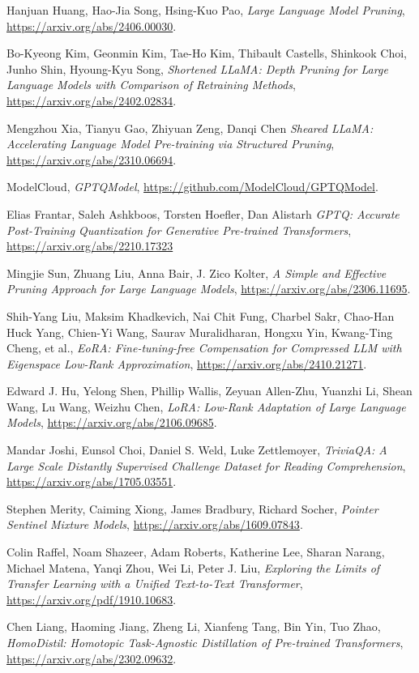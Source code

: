 \begin{thebibliography}{9}
	Hanjuan Huang, Hao-Jia Song, Hsing-Kuo Pao,
	\textit{Large Language Model Pruning},
	\url{https://arxiv.org/abs/2406.00030}.

	Bo-Kyeong Kim, Geonmin Kim, Tae-Ho Kim, Thibault Castells, Shinkook Choi, Junho Shin, Hyoung-Kyu Song,
	\textit{Shortened LLaMA: Depth Pruning for Large Language Models with Comparison of Retraining Methods},
	\url{https://arxiv.org/abs/2402.02834}.

	Mengzhou Xia, Tianyu Gao, Zhiyuan Zeng, Danqi Chen
	\textit{Sheared LLaMA: Accelerating Language Model Pre-training via Structured Pruning},
	\url{https://arxiv.org/abs/2310.06694}.

	ModelCloud,
	\textit{GPTQModel},
	\url{https://github.com/ModelCloud/GPTQModel}.

	Elias Frantar, Saleh Ashkboos, Torsten Hoefler, Dan Alistarh
	\textit{GPTQ: Accurate Post-Training Quantization for Generative Pre-trained Transformers},
	\url{https://arxiv.org/abs/2210.17323}

	Mingjie Sun, Zhuang Liu, Anna Bair, J. Zico Kolter,
	\textit{A Simple and Effective Pruning Approach for Large Language Models},
	\url{https://arxiv.org/abs/2306.11695}.

	Shih-Yang Liu, Maksim Khadkevich, Nai Chit Fung, Charbel Sakr, Chao-Han Huck Yang, Chien-Yi Wang, Saurav Muralidharan, Hongxu Yin, Kwang-Ting Cheng, et al.,
	\textit{EoRA: Fine-tuning-free Compensation for Compressed LLM with Eigenspace Low-Rank Approximation},
	\url{https://arxiv.org/abs/2410.21271}.

	Edward J. Hu, Yelong Shen, Phillip Wallis, Zeyuan Allen-Zhu, Yuanzhi Li, Shean Wang, Lu Wang, Weizhu Chen,
	\textit{LoRA: Low-Rank Adaptation of Large Language Models},
	\url{https://arxiv.org/abs/2106.09685}.

	Mandar Joshi, Eunsol Choi, Daniel S. Weld, Luke Zettlemoyer,
	\textit{TriviaQA: A Large Scale Distantly Supervised Challenge Dataset for Reading Comprehension},
	\url{https://arxiv.org/abs/1705.03551}.

	Stephen Merity, Caiming Xiong, James Bradbury, Richard Socher,
	\textit{Pointer Sentinel Mixture Models},
	\url{https://arxiv.org/abs/1609.07843}.

	Colin Raffel, Noam Shazeer, Adam Roberts, Katherine Lee, Sharan Narang, Michael Matena, Yanqi Zhou, Wei Li, Peter J. Liu,	
	\textit{Exploring the Limits of Transfer Learning with a Unified Text-to-Text Transformer},
	\url{https://arxiv.org/pdf/1910.10683}.

	Chen Liang, Haoming Jiang, Zheng Li, Xianfeng Tang, Bin Yin, Tuo Zhao,
	\textit{HomoDistil: Homotopic Task-Agnostic Distillation of Pre-trained Transformers},
	\url{https://arxiv.org/abs/2302.09632}.

\end{thebibliography}